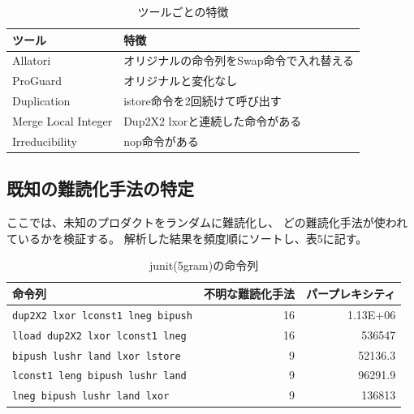 \documentclass[a4j,fleqn,10pt]{jarticle}
\begin{document}
\begin{table}[t]
  \centering
  \footnotesize{
    \caption{ツールごとの特徴}\label{table:caractor}
  \begin{tabular}{l|l}
    ツール              & 特徴　\\ \hline
    Allatori            & オリジナルの命令列をSwap命令で入れ替える \\
    ProGuard            & オリジナルと変化なし \\
    Duplication         & istore命令を2回続けて呼び出す \\
    Merge Local Integer & Dup2X2 lxorと連続した命令がある \\
    Irreducibility      & nop命令がある \\
  \end{tabular}}
\end{table}

\subsection{既知の難読化手法の特定}
ここでは、未知のプロダクトをランダムに難読化し、
どの難読化手法が使われているかを検証する。
解析した結果を頻度順にソートし、表5に記す。
\begin{table}[t]
  \centering
  \footnotesize{
    \caption{junit(5gram)の命令列}\label{table:junit}
  \begin{tabular}{lrr}
    命令列 & 
    \multicolumn{1}{p{1cm}}{不明な難読化手法} & 
    \multicolumn{1}{p{1cm}}{パープレキシティ} \\ \hline
    \texttt{dup2X2 lxor lconst1 lneg bipush}     & 16 & 1.13E+06 \\
    \texttt{lload dup2X2 lxor lconst1 lneg}      & 16 & 536547 \\
    \texttt{bipush lushr land lxor lstore}       &  9 & 52136.3 \\
    \texttt{lconst1 leng bipush lushr land}      &  9 & 96291.9 \\
    \texttt{lneg bipush lushr land lxor}         &  9 & 136813 \\
  \end{tabular}}
\end{table}
\end{document}
